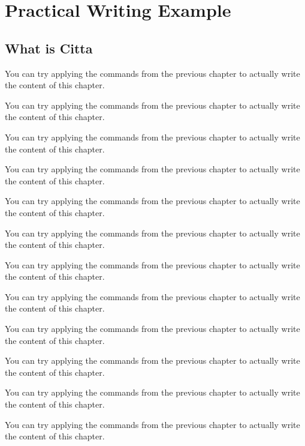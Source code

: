 \chapter{Practical Writing Example}
\starthere

\section{What is Citta}
You can try applying the commands from the previous chapter to actually write the content of this chapter.

You can try applying the commands from the previous chapter to actually write the content of this chapter.

You can try applying the commands from the previous chapter to actually write the content of this chapter.

You can try applying the commands from the previous chapter to actually write the content of this chapter.

You can try applying the commands from the previous chapter to actually write the content of this chapter.

You can try applying the commands from the previous chapter to actually write the content of this chapter.

You can try applying the commands from the previous chapter to actually write the content of this chapter.

You can try applying the commands from the previous chapter to actually write the content of this chapter.

You can try applying the commands from the previous chapter to actually write the content of this chapter.

You can try applying the commands from the previous chapter to actually write the content of this chapter.

You can try applying the commands from the previous chapter to actually write the content of this chapter.

You can try applying the commands from the previous chapter to actually write the content of this chapter.

